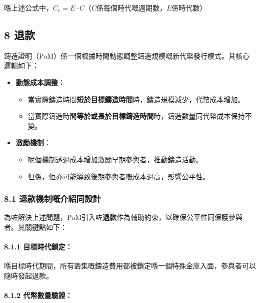 \documentclass[
]{article}
\providecommand{\tightlist}{%
  \setlength{\itemsep}{0pt}\setlength{\parskip}{0pt}}
\begin{document}
喺上述公式中，\(C_e = E \cdot C\)（\(C\)係每個時代嘅週期數，\(E\)係時代數）

\subsection{8 退款}\label{ux9000ux6b3e}

鑄造證明（PoM）係一個根據時間動態調整鑄造規模嘅新代幣發行模式。其核心邏輯如下：

\begin{itemize}
\tightlist
\item
  \textbf{動態成本調整}：

  \begin{itemize}
  \tightlist
  \item
    當實際鑄造時間\textbf{短於目標鑄造時間}時，鑄造規模減少，代幣成本增加。
  \item
    當實際鑄造時間\textbf{等於或長於目標鑄造時間}時，鑄造數量同代幣成本保持不變。
  \end{itemize}
\item
  \textbf{激勵機制}：

  \begin{itemize}
  \tightlist
  \item
    呢個機制透過成本增加激勵早期參與者，推動鑄造活動。
  \item
    但係，佢亦可能導致後期參與者嘅成本過高，影響公平性。
  \end{itemize}
\end{itemize}

\subsubsection{8.1
退款機制嘅介紹同設計}\label{ux9000ux6b3eux6a5fux5236ux5605ux4ecbux7d39ux540cux8a2dux8a08}

為咗解決上述問題，PoM引入咗\textbf{退款}作為輔助約束，以確保公平性同保護參與者。其關鍵點如下：

\paragraph{8.1.1
目標時代鎖定：}\label{ux76eeux6a19ux6642ux4ee3ux9396ux5b9a}

喺目標時代期間，所有籌集嘅鑄造費用都被鎖定喺一個特殊金庫入面，參與者可以隨時發起退款。

\paragraph{8.1.2
代幣數量驗證：}\label{ux4ee3ux5e63ux6578ux91cfux9a57ux8b49}
\end{document}
